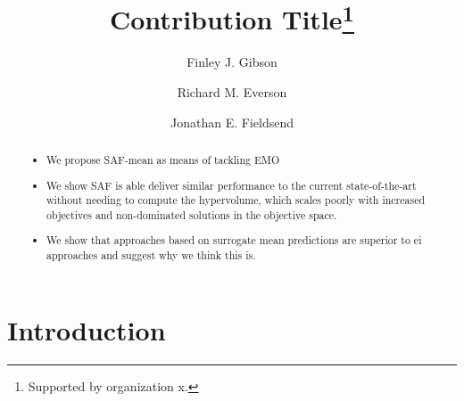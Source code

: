 \documentclass[runningheads]{llncs}
\begin{document}
%
\title{Contribution Title\thanks{Supported by organization x.}}
%

\author{Finley J. Gibson\and
Richard M. Everson\and
Jonathan E. Fieldsend}
%
%
%
\maketitle              %


\begin{abstract}

\begin{itemize}
    \item We propose SAF-mean as means of tackling EMO
    \item We show SAF is able deliver similar performance to the current state-of-the-art without needing to compute the hypervolume, which scales poorly with increased objectives and non-dominated solutions in the objective space.
    \item We show that approaches based on surrogate mean predictions are superior to ei approaches and suggest why we think this is. 
 
\end{itemize}

\end{abstract}
%
%
%
\section{Introduction}
\end{document}
